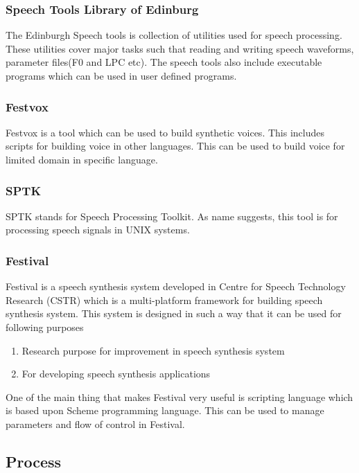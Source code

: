 \begin{itemize}
\subsubsection{Speech Tools Library of Edinburg}
The Edinburgh Speech tools is collection of utilities used for speech processing. These utilities cover major tasks such that reading and 
writing speech waveforms, parameter files(F0 and LPC etc). The speech tools also include executable programs which can 
be used in user defined programs.


\subsubsection{Festvox}
Festvox is a tool which can be used to build synthetic voices. This includes scripts for building voice in other languages. 
This can be used to build voice for limited domain in specific language.

\subsubsection{SPTK}
SPTK stands for Speech Processing Toolkit. As name suggests, this tool is for processing speech signals in UNIX systems. 

\subsubsection{Festival}

Festival is a speech synthesis system developed in Centre for Speech Technology Research (CSTR) which is a multi-platform 
framework for building speech synthesis system. This system is designed in such a way that it can be used for following purposes

\begin{enumerate}
  \item Research purpose for improvement in speech synthesis system
  \item For developing speech synthesis applications
\end{enumerate}

One of the main thing that makes Festival very useful is scripting language which is based upon Scheme programming language. This can be used to manage parameters and flow of  control in Festival. 

\subsection{Process}


\end{itemize}
